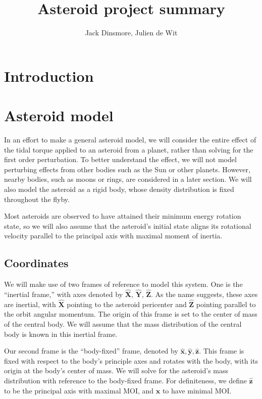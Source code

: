 \documentclass[11pt]{article}
\newcommand{\unit}[1]{\hat{\mathbf{#1}}}
\begin{document}
\title{Asteroid project summary}
\author{Jack Dinsmore, Julien de Wit}

\maketitle

\section{Introduction}


\section{Asteroid model}
In an effort to make a general asteroid model, we will consider the entire effect of the tidal torque applied to an asteroid from a planet, rather than solving for the first order perturbation. To better understand the effect, we will not model perturbing effects from other bodies such as the Sun or other planets. However, nearby bodies, such as moons or rings, are considered in a later section. We will also model the asteroid as a rigid body, whose density distribution is fixed throughout the flyby.

Most asteroids are observed to have attained their minimum energy rotation state, so we will also assume that the asteroid's initial state aligns its rotational velocity parallel to the principal axis with maximal moment of inertia.

\subsection{Coordinates}
\label{sec:coordinates}
We will make use of two frames of reference to model this system. One is the ``inertial frame,'' with axes denoted by $\unit{X}$, $\unit{Y}$, $\unit{Z}$. As the name suggests, these axes are inertial, with $\unit{X}$ pointing to the asteroid pericenter and $\unit{Z}$ pointing parallel to the orbit angular momentum. The origin of this frame is set to the center of mass of the central body. We will assume that the mass distribution of the central body is known in this inertial frame.

Our second frame is the ``body-fixed'' frame, denoted by $\unit{x}, \unit{y}, \unit{z}$. This frame is fixed with respect to the body's principle axes and rotates with the body, with its origin at the body's center of mass. We will solve for the asteroid's mass distribution with reference to the body-fixed frame. For definiteness, we define $\unit{z}$ to be the principal axis with maximal MOI, and $\unit{x}$ to have minimal MOI.
\end{document}
